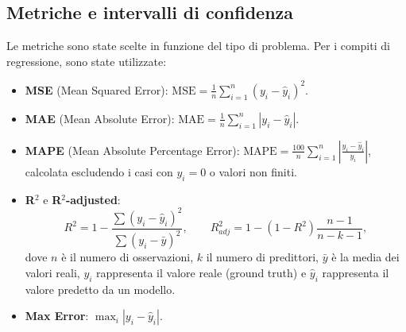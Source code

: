 \documentclass[a4paper,12pt]{report}
\begin{document}
	\subsection{Metriche e intervalli di confidenza}
	Le metriche sono state scelte in funzione del tipo di problema. Per i compiti di regressione, sono state utilizzate:
	\begin{itemize}
		\item \textbf{MSE} (Mean Squared Error): \(\text{MSE} = \frac{1}{n} \sum_{i=1}^{n} (y_i - \hat{y}_i)^2\).
		\item \textbf{MAE} (Mean Absolute Error): \(\text{MAE} = \frac{1}{n} \sum_{i=1}^{n} |y_i - \hat{y}_i|\).
		\item \textbf{MAPE} (Mean Absolute Percentage Error): \(\text{MAPE} = \frac{100}{n} \sum_{i=1}^{n} \left| \frac{y_i - \hat{y}_i}{y_i} \right|\), calcolata escludendo i casi con \(y_i=0\) o valori non finiti.
		\item \textbf{R\(^2\)} e \textbf{R\(^2\)-adjusted}:
		\[
		R^2 = 1 - \frac{\sum (y_i - \hat{y}_i)^2}{\sum (y_i - \bar{y})^2}, \qquad
		R^2_{adj} = 1 - (1 - R^2)\frac{n-1}{n-k-1},
		\]
		dove \(n\) è il numero di osservazioni, \(k\) il numero di predittori, $\bar{y}$ è la media dei valori reali, $y_i$ rappresenta il valore reale (ground truth) e $\hat{y}_i$ rappresenta il valore predetto da un modello.
		\item \textbf{Max Error}: \(\max_i |y_i - \hat{y}_i|\).
	\end{itemize}
	
\end{document}
